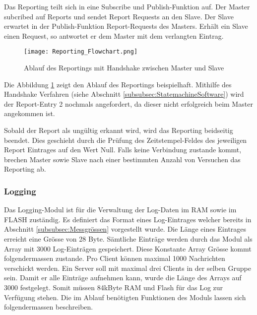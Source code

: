 Das Reporting teilt sich in eine Subscribe und Publish-Funktion auf.
Der Master subcribed auf Reports und sendet Report Requests an den Slave.
Der Slave erwartet in der Publish-Funktion Report-Requests des Masters.
Erhält ein Slave einen Request, so antwortet er dem Master mit dem verlangten Eintrag.

\begin{figure}[H]
	\centering
	\texttt{[image: Reporting\_Flowchart.png]}
	\caption{Ablauf des Reportings mit Handshake zwischen Master und Slave}\label{fig:ReportingAblauf}
\end{figure}

Die Abbildung \ref{fig:ReportingAblauf} zeigt den Ablauf des Reportings beispielhaft.
Mithilfe des Handshake Verfahren (siehe Abschnitt \ref{subsubsec:StatemachineSoftware}) wird der Report-Entry 2 nochmals angefordert, da dieser nicht erfolgreich beim Master angekommen ist.

Sobald der Report als ungültig erkannt wird, wird das Reporting beidseitig beendet.
Dies geschieht durch die Prüfung des Zeitstempel-Feldes des jeweiligen Report Eintrages auf den Wert Null.
Falls keine Verbindung zustande kommt, brechen Master sowie Slave nach einer bestimmten Anzahl von Versuchen das Reporting ab.


\subsubsection{Logging}\label{subsubsec:Logging}
Das Logging-Modul ist für die Verwaltung der Log-Daten im RAM sowie im FLASH zuständig.
Es definiert das Format eines Log-Eintrages welcher bereits in Abschnitt \ref{subsubsec:Messgrössen} vorgestellt wurde.
Die Länge eines Eintrages erreicht eine Grösse von 28 Byte.
Sämtliche Einträge werden durch das Modul als Array mit 3000 Log-Einträgen gespeichert.
Diese Konstante Array Grösse kommt folgendermassen zustande.
Pro Client können maximal 1000 Nachrichten verschickt werden.
Ein Server soll mit maximal drei Clients in der selben Gruppe sein.
Damit er alle Einträge aufnehmen kann, wurde die Länge des Arrays auf 3000 festgelegt.
Somit müssen 84kByte RAM und Flash für das Log zur Verfügung stehen. Die im Ablauf benötigten Funktionen des Moduls lassen sich folgendermassen beschreiben. 

